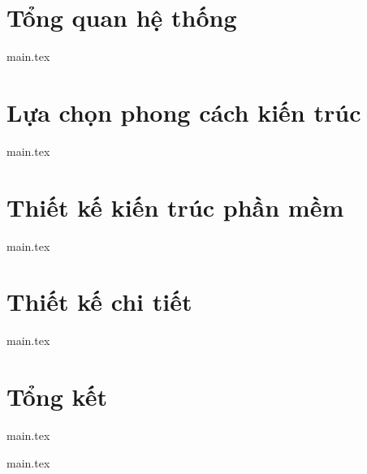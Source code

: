 \documentclass[12pt, a4paper]{report}
\theoremstyle{definition}
\begin{document}

\clearpage

\thispagestyle{empty}


\setcounter{page}{1}

\chapter{Tổng quan hệ thống}
\label{chap:overall}
\thispagestyle{fancy}
{main.tex}


\chapter{Lựa chọn phong cách kiến trúc}\label{chap:arch-choice}
\thispagestyle{fancy}
{main.tex}



\chapter{Thiết kế kiến trúc phần mềm}
\label{chap:arch-design}
\thispagestyle{fancy}
{main.tex}



\chapter{Thiết kế chi tiết}
\label{chap:detailed-design}
\thispagestyle{fancy}
{main.tex}



\chapter{Tổng kết}
\label{chap:summary}
\thispagestyle{fancy}
{main.tex}



\newpage
\appendix
{main.tex}


\newpage


\end{document}
